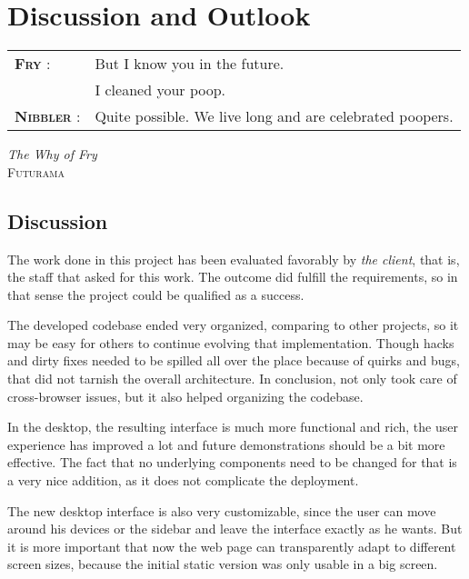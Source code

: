 \chapter{Discussion and Outlook} %
\label{cha:conclusions}

\setlength{\epigraphwidth}{8cm}
\renewcommand{\tabcolsep}{0em}

\epigraph{
  \begin{tabular}{p{1.75cm}p{6cm}}
    \footnotesize{\textbf{\textsc{Fry}} :}
      & But I know you in the future.\\
      & I cleaned your poop. \\
    \footnotesize{\textbf{\textsc{Nibbler}} :}
      & Quite possible. We live long and are celebrated poopers. \\
  \end{tabular}
  \vspace{1em}
}{\textit{The Why of Fry}\\ \textsc{Futurama}}

\newpage

\section{Discussion} %
\label{sec:discussion}

The work done in this project has been evaluated favorably by \emph{the client}, that is, the  staff that asked for this work.
The outcome did fulfill the requirements, so in that sense the project could be qualified as a success.

The developed codebase ended very organized, comparing to other  projects, so it may be easy for others to continue evolving that implementation.
Though hacks and dirty fixes needed to be spilled all over the place because of  quirks and bugs, that did not tarnish the overall architecture.
In conclusion,  not only took care of cross-browser issues, but it also helped organizing the codebase.

In the desktop, the resulting interface is much more functional and rich, the user experience has improved a lot and future demonstrations should be a bit more effective.
The fact that no underlying components need to be changed for that is a very nice addition, as it does not complicate the deployment.

The new desktop interface is also very customizable, since the user can move around his devices or the sidebar and leave the interface exactly as he wants.
But it is more important that now the web page can transparently adapt to different screen sizes, because the initial static version was only usable in a big screen.

